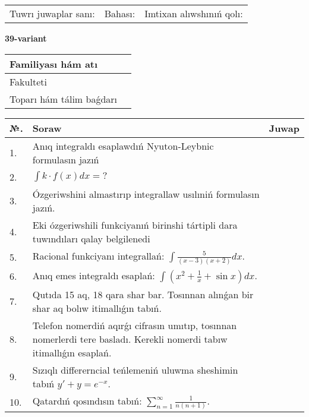 \documentclass{article}
\begin{document}
\vspace{1cm}

\begin{tabular}{ c c c }
Tuwrı juwaplar sanı: \underline{\hspace{2cm}} & Bahası: \underline{\hspace{2cm}} & Imtixan alıwshınıń qolı: \underline{\hspace{2cm}} \\
\end{tabular}

\newpage

\begin{center}\textbf{39-variant}\end{center}

\bgroup
\def\arraystretch{1.5}
\begin{tabular}{ |m{6cm}|m{10cm}| }
  \hline
  Familiyası hám atı & \\
  \hline
  Fakulteti &\\
  \hline
  Toparı hám tálim baǵdarı & \\
  \hline
\end{tabular}
\egroup

\vspace{0.5cm}

\bgroup
\def\arraystretch{2}
\begin{tabular}{ |l|m{8cm}|m{7cm}| }
  \hline
  №. & Soraw & Juwap \\
  \hline
  1. & Anıq integraldı esaplawdıń Nyuton-Leybnic formulasın jazıń &  \\
  \hline
  2. & $\displaystyle\int k \cdot f(x)dx = ?$ &  \\
  \hline
  3. & Ózgeriwshini almastırıp integrallaw usılıniń formulasın jazıń. &  \\
  \hline
  4. & Eki ózgeriwshili funkciyanıń birinshi tártipli dara tuwındıları qalay belgilenedi &  \\
  \hline
  5. & Racional funkciyanı integrallań: $\displaystyle\int {\frac{5}{(x - 3)(x + 2)}dx}$. &  \\
  \hline
  6. & Anıq emes integraldı esaplań: $\displaystyle\int(x^{2}+\frac{1}{x} + \sin x)dx$. &  \\
  \hline
  7. & Qutıda 15 aq, 18 qara shar bar. Tosınnan alınǵan bir shar aq bolıw itimallıǵın tabıń. &  \\
  \hline
  8. & Telefon nomerdiń aqırǵı cifrasın umıtıp, tosınnan nomerlerdi tere basladı. Kerekli nomerdi tabıw itimallıǵın esaplań. &  \\
  \hline
  9. & Sızıqlı differerncial teńlemeniń uluwma sheshimin tabıń $y' + y =e^{-x}$. &  \\
  \hline
  10. & Qatardıń qosındısın tabıń: $\displaystyle\sum_{n = 1}^{\infty}\frac{1}{n(n + 1)}$. &  \\
  \hline
\end{tabular}
\egroup
\end{document}
